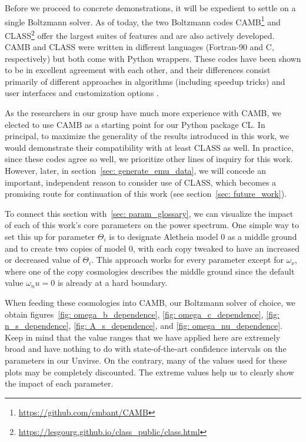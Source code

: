 
Before we proceed to concrete demonstrations, it will be expedient to settle
on a single Boltzmann solver. As of today, the two Boltzmann codes
CAMB\footnote{\url{https://github.com/cmbant/CAMB}} and
CLASS\footnote{\url{https://lesgourg.github.io/class_public/class.html}} offer
the largest suites of features and are also actively developed. CAMB and
CLASS were written in different languages (Fortran-90 and C, respectively)
but both come with Python wrappers. These codes have been shown to be in 
excellent agreement with each other, and their
differences consist primarily of different approaches in algorithms (including 
speedup tricks) and user interfaces and customization options
.

As the researchers in our group have much more experience with CAMB, we 
elected to use CAMB as a starting point for our Python package
CL. In principal, to maximize the generality of 
the results introduced in this 
work, we would demonstrate their compatibility with at least CLASS as well. In 
practice, since these codes agree so well, we prioritize other lines of 
inquiry
for this work. However, later, in section~\ref{sec: generate_emu_data}, we 
will concede an important, 
independent reason to consider use of CLASS, which becomes a promising route
for continuation of this work (see section~\ref{sec: future_work}).

\begin{comment}
\textcolor{green}{Furthermore, the CLASS documentation
is not nearly as strong as it is with CAMB, and we already encountered
extreme difficulty simply in recreating results already previously obtained
via CAMB!}
\end{comment}


To connect this section with~\ref{sec: param_glossary}, we can visualize the
impact of each of this work's core parameters on the power spectrum. One
simple way to set this up for parameter $\Theta_i$ is to designate Aletheia 
model 0 as a middle ground and to create two copies of model 0, with each
copy tweaked to have an increased or decreased value of $\Theta_i$. This
approach works for every parameter except for $\omega_\nu$, where one of the
copy cosmologies describes the middle ground since the default value
$\omega_nu = 0$ is already at a hard boundary.

When feeding these cosmologies into CAMB, our Boltzmann solver of choice, we
obtain figures~\ref{fig: omega_b_dependence}, \ref{fig: omega_c_dependence}, 
\ref{fig: n_s_dependence}, \ref{fig: A_s_dependence}, and \ref{fig: 
omega_nu_dependence}. Keep in mind that the value ranges that we have applied
here are extremely broad and have nothing to do with state-of-the-art
confidence intervals on the parameters in our Unvirse. On the 
contrary, many of the values used for these plots may be completely 
discounted. The extreme values help us to clearly show the impact of each
parameter.

